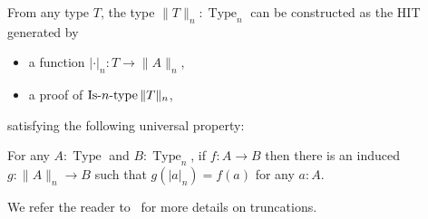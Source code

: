 \documentclass[notfinal]{jfrarticle}
\DeclareMathOperator{\Type}{Type}
\DeclareMathOperator{\HProp}{HProp}
\DeclareMathOperator{\IsHProp}{IsHProp}
\DeclareMathOperator{\Contr}{Contr}
\DeclareMathOperator{\IsContr}{IsContr}
\newcommand \defeq {\overset{de\hspace{-0.2ex}f}{=}}
\def\mymathhyphen{{\hbox{-}}}
\newcommand{\IsType}[1]
{\mathop{\mathrm{Is\mymathhyphen}#1\mathrm{\mymathhyphen type}} }
\newcommand \squash[1] {\| #1 \| }
\newcommand{\eg}{\emph{e.g.}}
\begin{document}

From any type $T$, the type
$\|T\|_n:\Type_n$ can be constructed as the HIT generated by
\begin{itemize}
\item a function $|\cdot|_n : T \to \|A\|_n$,
\item a proof of $\IsType n \|T\|_n$,
\end{itemize}
 satisfying the following universal property:


\begin{lem}
  For any $A:\Type$ and $B:\Type_n$, if $f:A \to B$ then there is an
  induced $g:\|A\|_n\to B$ such that $g(|a|_n)= f(a)$ for any $a:A$.
\end{lem}
%
We refer the reader to~\cite[7.3]{hottbook} for more details on 
truncations.
\end{document}
